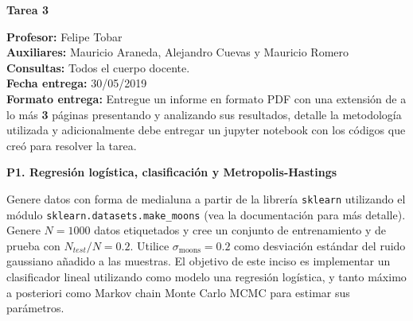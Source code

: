 \documentclass[11pt,letterpaper]{article}
\begin{document}
\pagestyle{fancy}
\fancyhf{}

\begin{center}
\large {\textbf{Tarea 3}}\\
\end{center}
\textbf{Profesor:} Felipe Tobar\\ 
\textbf{Auxiliares:} Mauricio Araneda, Alejandro Cuevas y Mauricio Romero \\
\textbf{Consultas:} Todos el cuerpo docente.\\
\textbf{Fecha entrega:} 30/05/2019 \\

\textbf{Formato entrega:} Entregue un informe en formato PDF con una extensión de a lo más \textbf{3} páginas presentando y analizando sus resultados, detalle la metodología utilizada y adicionalmente debe entregar un jupyter notebook con los códigos que creó para resolver la tarea.
\vspace{5mm}

\noindent\textbf{P1. Regresión logística, clasificación y Metropolis-Hastings}
\vspace{5 mm}

Genere datos con forma de medialuna a partir de la librería \texttt{sklearn} utilizando el módulo \texttt{sklearn.datasets.make\_moons} (vea la documentación para más detalle). Genere $N=1000$ datos etiquetados y cree un conjunto de entrenamiento y de prueba con $N_{test}/N = 0.2$. Utilice $\sigma_{\text{moons}}=0.2$ como desviación estándar del ruido gaussiano añadido a las muestras. El objetivo de este inciso es implementar un clasificador lineal utilizando como modelo una regresión logística, y tanto máximo a posteriori como Markov chain Monte Carlo MCMC para estimar sus parámetros.
    
\end{document}
